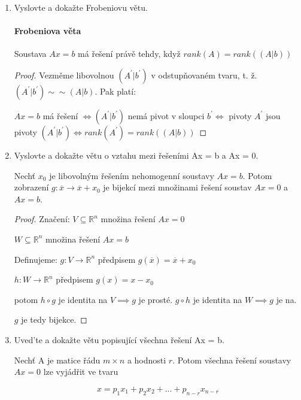 \documentclass[10pt,a4paper]{article}
\begin{document}
\begin{enumerate}
\begin{proof}
To je spor, neboť obě soustavy mají shodná řešení.
\end{proof}


\item Vyslovte a dokažte Frobeniovu větu.

\paragraph{Frobeniova věta} Soustava $Ax = b$ má řešení právě tehdy, když $rank(A) = rank((A | b))$
\begin{proof}
Vezměme libovolnou $(A^\prime|b^\prime)$  v odstupňovaném tvaru, t. ž. $(A^\prime|b^\prime) \sim \sim (A | b)$. Pak platí:

$Ax = b$ má řešení $\iff (A^\prime|b^\prime)$ nemá pivot v sloupci $b^\prime \iff$ pivoty $A^\prime$ jsou pivoty $(A^\prime|b^\prime) \iff rank(A^\prime) = rank((A|b))$ 
\end{proof}

\item Vyslovte a dokažte větu o vztahu mezi řešeními Ax = b a Ax = 0. 

Nechť $x_0$ je libovolným řešením nehomogenní soustavy $Ax = b$. Potom zobrazení $g: \overline{x} \to \overline{x} + x_0$ je bijekcí  mezi množinami řešení  soustav $Ax = 0$ a $Ax = b$.

\begin{proof} 
Značení: $V \subseteq \mathbb{R}^n$ množina řešení $Ax = 0$

$W \subseteq \mathbb{R}^n$ množina řešení $Ax = b$

Definujeme: $g: V \to \mathbb{R}^n$ předpisem $g(\overline{x})= \overline{x} + x_0$

$h: W \to \mathbb{R}^n$ předpisem $g(x)= x - x_0$

potom $h \circ g$ je identita na $V \implies g$ je prosté.
$g \circ h$ je identita na $W \implies g$ je na. 

$g$ je tedy bijekce.
\end{proof}

\item Uved’te a dokažte větu popisující všechna řešení Ax = b.

Nechť A je matice řádu $m \times n$ a hodnosti $r$. Potom všechna řešení soustavy $Ax = 0$ lze vyjádřit ve tvaru

\begin{equation*}
x = p_1x_1 + p_2x_2 + ... + p_{n - r}x_{n-r}
\end{equation*}


\end{enumerate}
\end{document}
